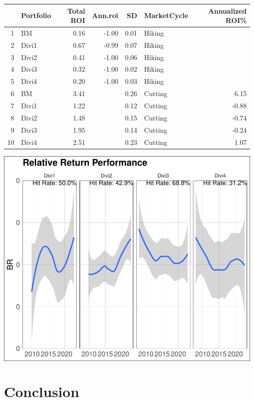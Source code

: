 \documentclass[12pt,preprint, authoryear]{elsarticle}
\let\origtable\table
\let\endorigtable\endtable
\renewenvironment{table}[1][2] {
    \expandafter\origtable\expandafter[H]
} {
    \endorigtable
}
\numberwithin{equation}{section}
\numberwithin{figure}{section}
\numberwithin{table}{section}
\begin{document}
\begin{table}[H]
\centering
\begin{tabular}{rlrrrlr}
  \hline
 & Portfolio & Total ROI & Ann.roi & SD & MarketCycle & Annualized ROI\% \\ 
  \hline
1 & BM & 0.16 & -1.00 & 0.01 & Hiking  &  \\ 
  2 & Divi1 & 0.67 & -0.99 & 0.07 & Hiking  &  \\ 
  3 & Divi2 & 0.41 & -1.00 & 0.06 & Hiking  &  \\ 
  4 & Divi3 & 0.32 & -1.00 & 0.02 & Hiking  &  \\ 
  5 & Divi4 & 0.20 & -1.00 & 0.03 & Hiking  &  \\ 
  6 & BM & 3.41 &  & 0.26 & Cutting & 6.15 \\ 
  7 & Divi1 & 1.22 &  & 0.12 & Cutting & -0.88 \\ 
  8 & Divi2 & 1.48 &  & 0.15 & Cutting & -0.74 \\ 
  9 & Divi3 & 1.95 &  & 0.14 & Cutting & -0.24 \\ 
  10 & Divi4 & 2.51 &  & 0.23 & Cutting & 1.07 \\ 
   \hline
\end{tabular}
\caption{Interest Rate Regime Performance \label{tab4}} 
\end{table}

\includegraphics{Much_Ado_About_Dividends_files/figure-latex/unnamed-chunk-5-1.pdf}

\newpage

\hypertarget{conclusion}{%
\section{Conclusion}\label{conclusion}}
\end{document}
